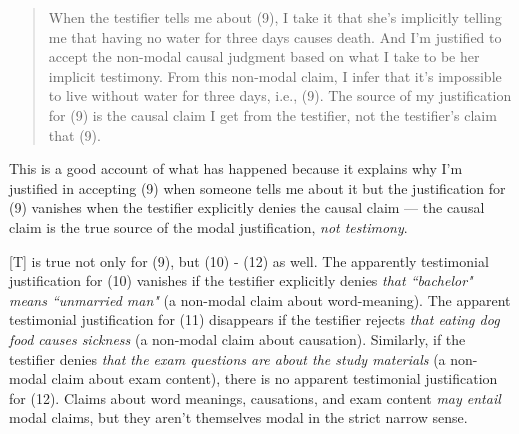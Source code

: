 \documentclass[a4paper,12pt]{article}
\begin{document}
\begin{quote}
When the testifier tells me about (9), I take it that she's implicitly telling me that having no water for three days causes death. And I'm justified to accept the non-modal causal judgment based on what I take to be her implicit testimony. From this non-modal claim, I infer that it's impossible to live without water for three days, i.e., (9). The source of my justification for (9) is the causal claim I get from the testifier, not the testifier's claim that (9).
\end{quote}

This is a good account of what has happened because it explains why I'm justified in accepting (9) when someone tells me about it but the justification for (9) vanishes when the testifier explicitly denies the causal claim --- the causal claim is the true source of the modal justification, \emph{not testimony}.\footnotemark


[T] is true not only for (9), but (10) - (12) as well. The apparently testimonial justification for (10) vanishes if the testifier explicitly denies \emph{that ``bachelor" means ``unmarried man"} (a non-modal claim about word-meaning). The apparent testimonial justification for (11) disappears if the testifier rejects \emph{that eating dog food causes sickness} (a non-modal claim about causation). Similarly, if the testifier denies \emph{that the exam questions are about the study materials} (a non-modal claim about exam content), there is no apparent testimonial justification for (12). Claims about word meanings, causations, and exam content \emph{may entail} modal claims, but they aren't themselves modal in the strict narrow sense.
\end{document}
